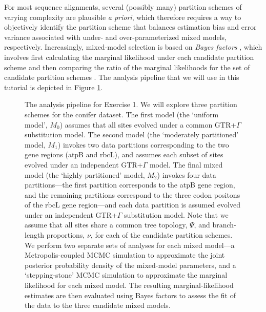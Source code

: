 For most sequence alignments, several (possibly many) partition schemes of varying complexity are plausible {\it a priori}, which therefore requires a way to objectively identify the partition scheme that balances estimation bias and error variance associated with under- and over-parameterized mixed models, respectively.
Increasingly, mixed-model selection is based on \textit{Bayes factors} \citep[{\it e.g.},][]{suchard01}, which involves first calculating the marginal likelihood under each candidate partition scheme and then comparing the ratio of the marginal likelihoods for the set of candidate partition schemes \citep{brandley05,nylander04,mcguire07}.
The analysis pipeline that we will use in this tutorial is depicted in Figure \ref{pipeline}.
\begin{figure}[h!]
\centering
{}
\caption{\small The analysis pipeline for Exercise 1. We will explore three partition schemes for the conifer dataset.
The first model (the `uniform model', $M_0$) assumes that all sites evolved under a common GTR+$\Gamma$ substitution model.
The second model (the `moderately partitioned' model, $M_1$) invokes two data partitions corresponding to the two gene regions (atpB and rbcL), and assumes each subset of sites evolved under an independent GTR+$\Gamma$ model.
The final mixed model (the `highly partitioned' model, $M_2$) invokes four data partitions---the first partition corresponds to the atpB gene region, and the remaining partitions correspond to the three codon positons of the rbcL gene region---and each data partition is assumed evolved under an independent GTR+$\Gamma$ substitution model.
Note that we assume that all sites share a common tree topology, $\Psi$, and branch-length proportions, $\nu$, for each of the candidate partition schemes.
We perform two separate sets of analyses for each mixed model---a Metropolis-coupled MCMC simulation to approximate the joint posterior probability density of the mixed-model parameters, and a `stepping-stone' MCMC simulation to approximate the marginal likelihood for each mixed model.
The resulting marginal-likelihood estimates are then evaluated using Bayes factors to assess the fit of the data to the three candidate mixed models.  
}
\label{pipeline}
\end{figure}
 
